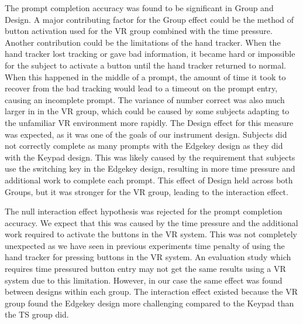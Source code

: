 The prompt completion accuracy was found to be significant in Group and Design.
A major contributing factor for the Group effect could be the method of button activation used for the VR group combined with the time pressure.
Another contribution could be the limitations of the hand tracker.
When the hand tracker lost tracking or gave bad information, it became hard or impossible for the subject to activate a button until the hand tracker returned to normal.
When this happened in the middle of a prompt, the amount of time it took to recover from the bad tracking would lead to a timeout on the prompt entry, causing an incomplete prompt.
The variance of number correct was also much larger in in the VR group, which could be caused by some subjects adapting to the unfamiliar VR environment more rapidly.
The Design effect for this measure was expected, as it was one of the goals of our instrument design.
Subjects did not correctly complete as many prompts with the Edgekey design as they did with the Keypad design.
This was likely caused by the requirement that subjects use the switching key in the Edgekey design, resulting in more time pressure and additional work to complete each prompt.
This effect of Design held across both Groups, but it was stronger for the VR group, leading to the interaction effect.

The null interaction effect hypothesis was rejected for the prompt completion accuracy.
We expect that this was caused by the time pressure and the additional work required to activate the buttons in the VR system.
This was not completely unexpected as we have seen in previous experiments time penalty of using the hand tracker for pressing buttons in the VR system.
An evaluation study which requires time pressured button entry may not get the same results using a VR system due to this limitation.
However, in our case the same effect was found between designs within each group.
The interaction effect existed because the VR group found the Edgekey design more challenging compared to the Keypad than the TS group did.

